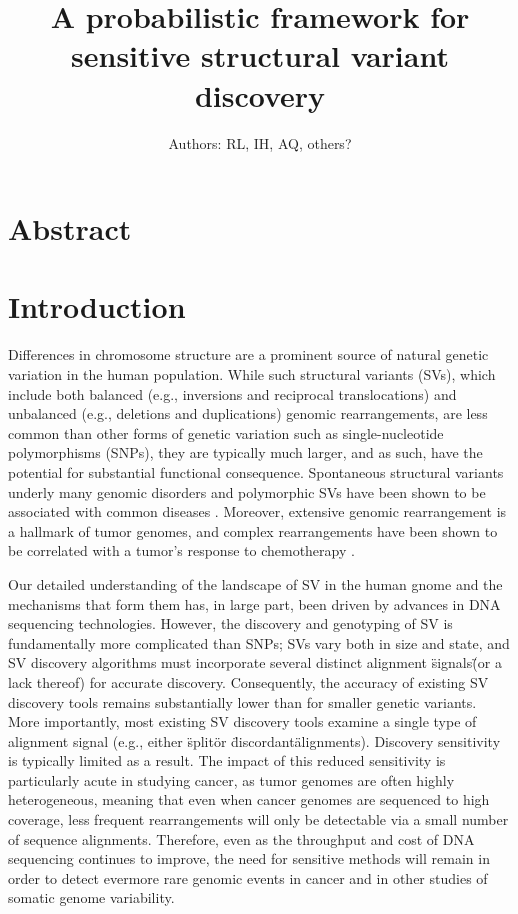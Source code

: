 \documentclass[11pt]{article}
\begin{document}
\title{A probabilistic framework for sensitive structural variant discovery}
\author{Authors: RL, IH, AQ, others?}
\maketitle


\section{Abstract}



\section{Introduction}

Differences in chromosome structure are a prominent source of natural 
genetic variation in the human population. While such structural variants (SVs),
which include both balanced (e.g., inversions and reciprocal translocations)
and unbalanced (e.g., deletions and duplications) genomic rearrangements, are 
less common than other forms of genetic variation such as single-nucleotide 
polymorphisms (SNPs), they are typically much larger, and as such, have the 
potential for substantial functional consequence. Spontaneous structural
variants underly many genomic disorders and polymorphic SVs have been shown to
be associated with common diseases \cite{McCarroll2008}. Moreover, extensive
genomic rearrangement is a hallmark of tumor genomes, and complex rearrangements
have been shown to be correlated with a tumor's response to chemotherapy
\cite{Rausch2012}.

Our detailed understanding of the landscape of SV in the human gnome and the
mechanisms that form them has, in large part, been driven by advances in DNA
sequencing technologies. However, the discovery and genotyping of SV is 
fundamentally more complicated than SNPs; SVs vary both in size and state, 
and SV discovery algorithms must incorporate several distinct alignment 
\"signals\" (or a lack thereof) for accurate discovery. Consequently, the
accuracy of existing SV discovery tools remains substantially lower than for
smaller genetic variants. More importantly, most existing SV discovery
tools examine a single type of alignment signal (e.g., either \"split\" or 
\"discordant\" alignments). Discovery sensitivity is typically limited as a 
result. The impact of this reduced sensitivity is particularly acute in studying 
cancer, as tumor genomes are often highly heterogeneous, meaning that even 
when cancer genomes are sequenced to high coverage, less frequent rearrangements 
will only be detectable via a small number of sequence alignments. Therefore,
even as the throughput and cost of DNA sequencing continues to improve, the
need for sensitive methods will remain in order to detect evermore rare
genomic events in cancer and in other studies of somatic genome variability.
\end{document}
